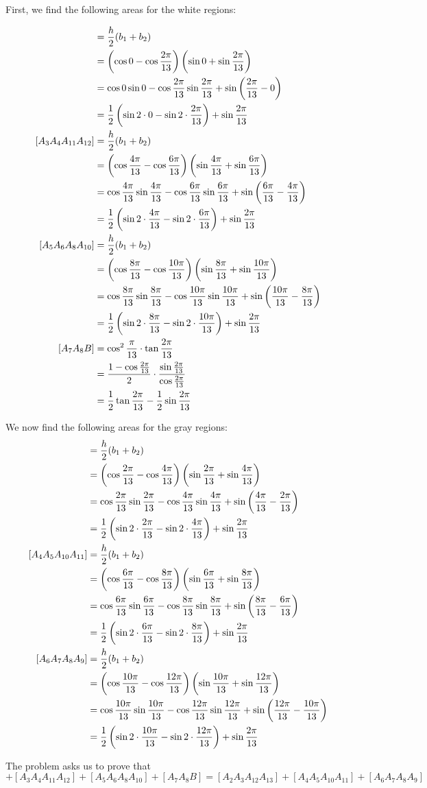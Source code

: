 \documentclass[10pt]{../usamts}
\begin{document}
\begin{solution}{5}
First, we find the following areas for the white regions:

\newcommand{\showareacalc}[2]{
    &= \frac{h}{2}(b_1 + b_2) \\
    &= \paren{\cos{#1} - \cos{#2}}\paren{\sin{#1} + \sin{#2}} \\
    &= \cos{#1}\sin{#1} - \cos{#2} \sin{#2} + \sin{\paren{#2 - #1}} \\
    &= \frac{1}{2}\paren{\sin{2 \cdot #1} - \sin{2 \cdot #2}} + \sin{\frac{2\pi}{13}}
}
\newcommand{\showtrianglebarea}{
    \frac{1}{2} \tan{\frac{2\pi}{13}} - \frac{1}{2} \sin{\frac{2\pi}{13}}
}

\newcommand{\sinthirteen}[1]{
    \sin{{\frac{#1\pi}{13}}}
}
\newcommand{\costhirteen}[1]{
    \cos{{\frac{#1\pi}{13}}}
}
\newcommand{\tanthirteen}[1]{
    \tan{{\frac{#1\pi}{13}}}
}

\newcommand{\expthirteen}[1]{
    e^{\frac{#1\pi}{13}}
}

\begin{align*} 
[A_1A_2A_3] \showareacalc{0}{\frac{2\pi}{13}} \\
[A_3A_4A_{11}A_{12}] \showareacalc{\frac{4\pi}{13}}{\frac{6\pi}{13}} \\
[A_5A_6A_{8}A_{10}] \showareacalc{\frac{8\pi}{13}}{\frac{10\pi}{13}} \\
    [A_7A_8B] &= \cos^2{\frac{\pi}{13}} \cdot \tan{\frac{2\pi}{13}} \\
              &= \frac{1 - \cos{\frac{2\pi}{13}}}{2} \cdot \frac{\sin{\frac{2\pi}{13}}}{\cos{\frac{2\pi}{13}}}\\
              &= \showtrianglebarea
\end{align*}

We now find the following areas for the gray regions:
\begin{align*}
[A_2A_3A_{12}A_{13}] \showareacalc{\frac{2\pi}{13}}{\frac{4\pi}{13}} \\
[A_4A_5A_{10}A_{11}] \showareacalc{\frac{6\pi}{13}}{\frac{8\pi}{13}} \\
[A_6A_7A_{8}A_{9}] \showareacalc{\frac{10\pi}{13}}{\frac{12\pi}{13}} \\
\end{align*}

The problem asks us to prove that
\begin{equation}
[A_1A_2A_3] + [A_3A_4A_{11}A_{12}] + [A_5A_6A_{8}A_{10}] + [A_7A_8B] = [A_2A_3A_{12}A_{13}] + [A_4A_5A_{10}A_{11}]+ [A_6A_7A_{8}A_{9}]
\end{equation}


\end{solution}
\end{document}
